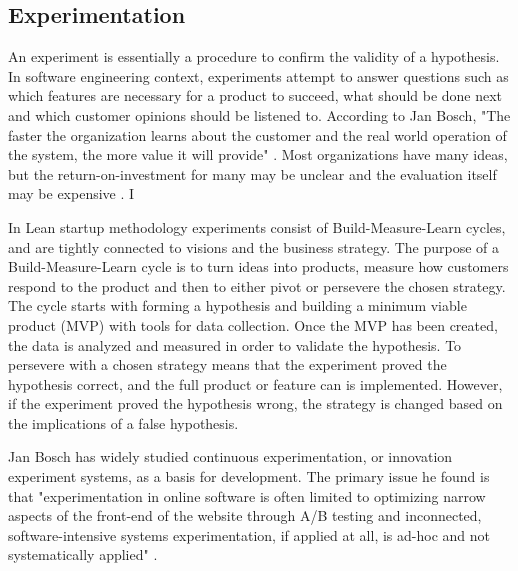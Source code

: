 \documentclass[conference]{IEEEtran}
\begin{document}
\subsection{Experimentation}

An experiment is essentially a procedure to confirm the validity of a hypothesis. In software engineering context, experiments attempt to answer questions such as which features are necessary for a product to succeed, what should be done next and which customer opinions should be listened to. According to Jan Bosch, "The faster the organization learns about the customer and the real world operation of the system, the more value it will provide" \cite{bosch2012building}. Most organizations have many ideas, but the return-on-investment for many may be unclear and the evaluation itself may be expensive \cite{kohavi2007practical}. I

In Lean startup methodology \cite{ries2011lean} experiments consist of Build-Measure-Learn cycles, and are tightly connected to visions and the business strategy. The purpose of a Build-Measure-Learn cycle is to turn ideas into products, measure how customers respond to the product and then to either pivot or persevere the chosen strategy. The cycle starts with forming a hypothesis and building a minimum viable product (MVP) with tools for data collection. Once the MVP has been created, the data is analyzed and measured in order to validate the hypothesis. To persevere with a chosen strategy means that the experiment proved the hypothesis correct, and the full product or feature can is implemented. However, if the experiment proved the hypothesis wrong, the strategy is changed based on the implications of a false hypothesis.

Jan Bosch has widely studied continuous experimentation, or innovation experiment systems, as a basis for development. The primary issue he found is that "experimentation in online software is often limited to optimizing narrow aspects of the front-end of the website through A/B testing and inconnected, software-intensive systems experimentation, if applied at all, is ad-hoc and not systematically applied" \cite{bosch2012building}.
\end{document}
